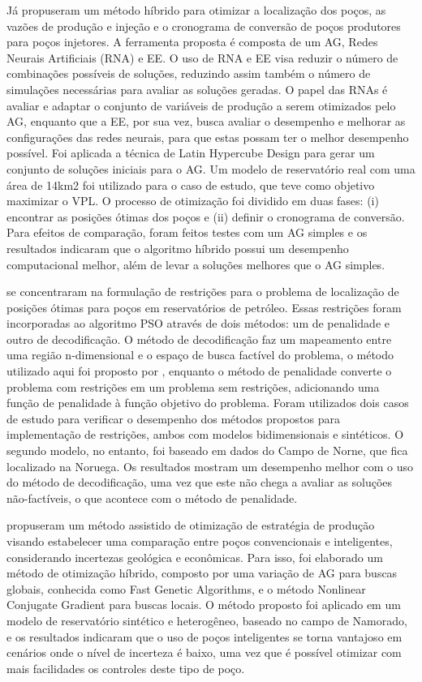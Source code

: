 Já  propuseram um método híbrido para otimizar a localização dos poços, as vazões de produção e injeção e o cronograma de conversão de poços produtores para poços injetores. A ferramenta proposta é composta de um AG, Redes Neurais Artificiais (RNA) e EE. O uso de RNA e EE visa reduzir o número de combinações possíveis de soluções, reduzindo assim também o número de simulações necessárias para avaliar as soluções geradas. O papel das RNAs é avaliar e adaptar o conjunto de variáveis de produção a serem otimizados pelo AG, enquanto que a EE, por sua vez, busca avaliar o desempenho e melhorar as configurações das redes neurais, para que estas possam ter o melhor desempenho possível. Foi aplicada a técnica de Latin Hypercube Design para gerar um conjunto de soluções iniciais para o AG. Um modelo de reservatório real com uma área de 14km2 foi utilizado para o caso de estudo, que teve como objetivo maximizar o VPL. O processo de otimização foi dividido em duas fases: (i) encontrar as posições ótimas dos poços e (ii) definir o cronograma de conversão. Para efeitos de comparação, foram feitos testes com um AG simples e os resultados indicaram que o algoritmo híbrido possui um desempenho computacional melhor, além de levar a soluções melhores que o AG simples.

 se concentraram na formulação de restrições para o problema de localização de posições ótimas para poços em reservatórios de petróleo. Essas restrições foram incorporadas ao algoritmo PSO através de dois métodos: um de penalidade e outro de decodificação. O método de decodificação faz um mapeamento entre uma região n-dimensional e o espaço de busca factível do problema, o método utilizado aqui foi proposto por , enquanto o método de penalidade converte o problema com restrições em um problema sem restrições, adicionando uma função de penalidade à função objetivo do problema. Foram utilizados dois casos de estudo para verificar o desempenho dos métodos propostos para implementação de restrições, ambos com modelos bidimensionais e sintéticos. O segundo modelo, no entanto, foi baseado em dados do Campo de Norne, que fica localizado na Noruega. Os resultados mostram um desempenho melhor com o uso do método de decodificação, uma vez que este não chega a avaliar as soluções não-factíveis, o que acontece com o método de penalidade.

 propuseram um método assistido de otimização de estratégia de produção visando estabelecer uma comparação entre poços convencionais e inteligentes, considerando incertezas geológica e econômicas. Para isso, foi elaborado um método de otimização híbrido, composto por uma variação de AG para buscas globais, conhecida como Fast Genetic Algorithms, e o método Nonlinear Conjugate Gradient para buscas locais. O método proposto foi aplicado em um modelo de reservatório sintético e heterogêneo, baseado no campo de Namorado, e os resultados indicaram que o uso de poços inteligentes se torna vantajoso em cenários onde o nível de incerteza é baixo, uma vez que é possível otimizar com mais facilidades os controles deste tipo de poço.

